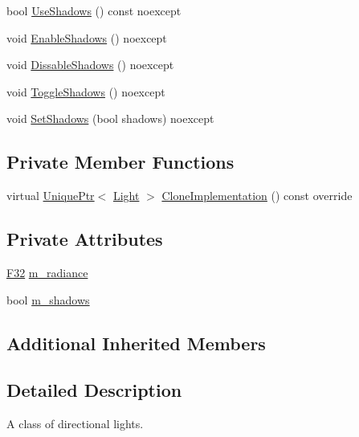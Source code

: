 \begin{DoxyCompactItemize}
bool \hyperlink{classmage_1_1_directional_light_a645e7f3d3e4dc4ebf11d7a6aa6950a18}{Use\+Shadows} () const noexcept
\item 
void \hyperlink{classmage_1_1_directional_light_a36436d5d99ccf6a0e49e81f26c3f9bc7}{Enable\+Shadows} () noexcept
\item 
void \hyperlink{classmage_1_1_directional_light_addd4803dee85892dfd57f51e155c6572}{Dissable\+Shadows} () noexcept
\item 
void \hyperlink{classmage_1_1_directional_light_a1c15d8e42526ed5ae7568cff5c7b25e0}{Toggle\+Shadows} () noexcept
\item 
void \hyperlink{classmage_1_1_directional_light_ab70b4298dc6616dbe22446e8e3298424}{Set\+Shadows} (bool shadows) noexcept
\end{DoxyCompactItemize}
\subsection*{Private Member Functions}
\begin{DoxyCompactItemize}
\item 
virtual \hyperlink{namespacemage_a3316d7143a973e37adf1110f2e80ca31}{Unique\+Ptr}$<$ \hyperlink{classmage_1_1_light}{Light} $>$ \hyperlink{classmage_1_1_directional_light_a122d3dcd7633a85ef8a85e7d768da36d}{Clone\+Implementation} () const override
\end{DoxyCompactItemize}
\subsection*{Private Attributes}
\begin{DoxyCompactItemize}
\item 
\hyperlink{namespacemage_aa97e833b45f06d60a0a9c4fc22ae02c0}{F32} \hyperlink{classmage_1_1_directional_light_aedba48c9e2590284f804ba7cc6225ec3}{m\+\_\+radiance}
\item 
bool \hyperlink{classmage_1_1_directional_light_a607a3dc01ee180f2044fe154c2b73903}{m\+\_\+shadows}
\end{DoxyCompactItemize}
\subsection*{Additional Inherited Members}


\subsection{Detailed Description}
A class of directional lights. 

